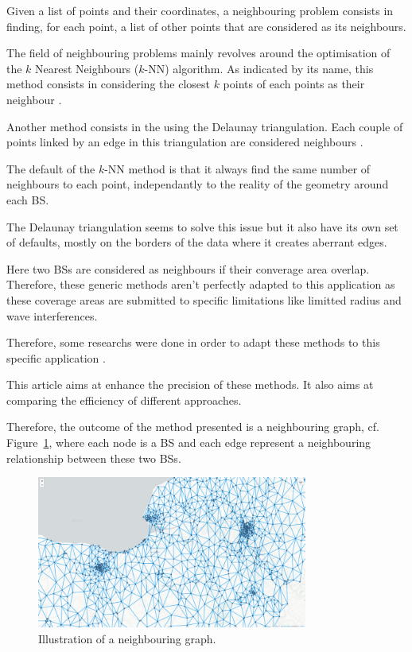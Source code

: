 \documentclass[lettersize,journal,english]{IEEEtran}
\begin{document}
    Given a list of points and their coordinates, a neighbouring problem consists in finding, for each point, a list of other points that are considered as its neighbours.

    The field of neighbouring problems mainly revolves around the optimisation of the $k$ Nearest Neighbours ($k$-NN) algorithm.
    As indicated by its name, this method consists in considering the closest $k$ points of each points as their neighbour \cite{art_kNN}.

    Another method consists in the using the Delaunay triangulation. Each couple of points linked by an edge in this triangulation are considered neighbours \cite{MULCHRONE2003689}.

    The default of the $k$-NN method is that it always find the same number of neighbours to each point, independantly to the reality of the geometry around each BS.
    
    The Delaunay triangulation seems to solve this issue but it also have its own set of defaults, mostly on the borders of the data where it creates aberrant edges.

    Here two BSs are considered as neighbours if their converage area overlap. Therefore, these generic methods aren't perfectly adapted to this application as these coverage areas are submitted to specific limitations like limitted radius and wave interferences.

    Therefore, some researchs were done in order to adapt these methods to this specific application \cite{patent_neighs}.

    This article aims at enhance the precision of these methods. It also aims at comparing the efficiency of different approaches. 

    Therefore, the outcome of the method presented is a neighbouring graph, cf. Figure~\ref{fig:neigh_graph}, where each node is a BS and each edge represent a neighbouring relationship between these two BSs.
    \begin{figure}
        \centering
        \includegraphics[width=3.5in]{images/illus_graphs/neighbouring_graph.png}
        \caption{Illustration of a neighbouring graph.}
        \label{fig:neigh_graph}
    \end{figure}
\end{document}
